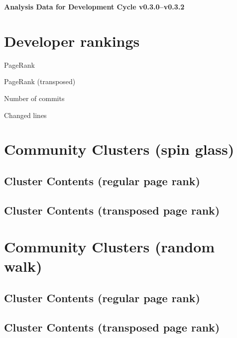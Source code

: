 \documentclass{article}
\begin{document}
\setlength{\parindent}{0pt}
\begin{center}
\begin{Large}
\textbf{Analysis Data for Development Cycle v0.3.0--v0.3.2}
\end{Large}
\end{center}
\section{Developer rankings}
\begin{small}\renewcommand{\tabcolsep}{1pt}
\begin{minipage}{0.5\linewidth}
PageRank\\

\end{minipage}%
\begin{minipage}{0.5\linewidth}
PageRank (transposed)\\

\end{minipage}

\renewcommand{\tabcolsep}{5pt}
\begin{minipage}{0.5\linewidth}
Number of commits\\

\end{minipage}%
\begin{minipage}{0.5\linewidth}
Changed lines\\

\end{minipage}
\end{small}
\newpage\section{Community Clusters (spin glass)}
\subsection{Cluster Contents (regular page rank)}
\newpage\subsection{Cluster Contents (transposed page rank)}
\newpage\section{Community Clusters (random walk)}
\subsection{Cluster Contents (regular page rank)}
\newpage\subsection{Cluster Contents (transposed page rank)}
\end{document}
